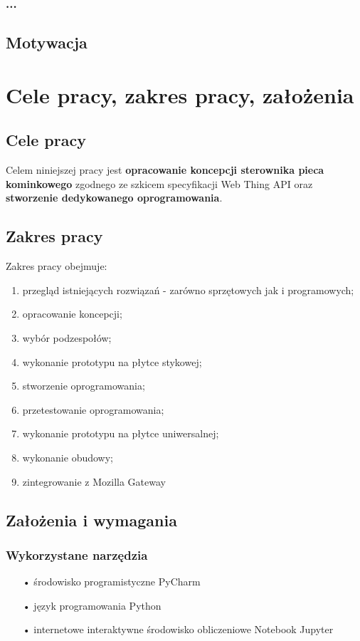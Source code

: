 \documentclass[11pt]{report}
\begin{document}
 \subsection{...}
 
 \section{Motywacja}


 \chapter{Cele pracy, zakres pracy, założenia}\label{ch:cele}

 \section{Cele pracy}
 Celem niniejszej pracy jest \textbf{opracowanie koncepcji sterownika pieca kominkowego} zgodnego ze szkicem specyfikacji Web Thing API oraz \textbf{stworzenie dedykowanego oprogramowania}.

 \section{Zakres pracy}
 Zakres pracy obejmuje:
 \begin{enumerate}
 \item przegląd istniejących rozwiązań - zarówno sprzętowych jak i programowych;
 \item opracowanie koncepcji;
 \item wybór podzespołów;
 \item wykonanie prototypu na płytce stykowej;
 \item stworzenie oprogramowania;
 \item przetestowanie oprogramowania; 
 \item wykonanie prototypu na płytce uniwersalnej;
 \item wykonanie obudowy;
 \item zintegrowanie z Mozilla Gateway
 \end{enumerate}
 
 \section{Założenia i wymagania}
 
 \subsection{Wykorzystane narzędzia}
 \begin{enumerate}
 \item[•] środowisko programistyczne PyCharm 
 \item[•] język programowania Python
 \item[•] internetowe interaktywne środowisko obliczeniowe Notebook Jupyter
 \end{enumerate}
 
\end{document}
